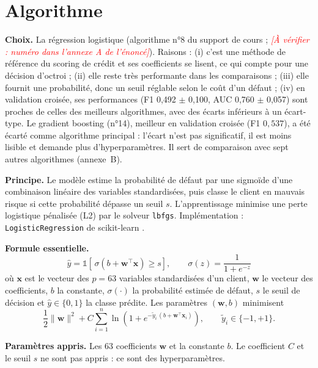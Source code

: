 \documentclass[12pt,a4paper]{article}
\newcommand{\verif}[1]{\textcolor{red}{\textit{[À vérifier : #1]}}}
\begin{document}
\section{Algorithme}\label{sec:algo}
\textbf{Choix.} La régression logistique (algorithme n°8 du support de cours \cite{cours} ; \verif{numéro dans l’annexe A de l’énoncé}). Raisons : (i) c’est une méthode de référence du scoring de crédit et ses coefficients se lisent, ce qui compte pour une décision d’octroi \cite{hand} ; (ii) elle reste très performante dans les comparaisons \cite{baesens} ; (iii) elle fournit une probabilité, donc un seuil réglable selon le coût d’un défaut ; (iv) en validation croisée, ses performances (F1 0{,}492 $\pm$ 0{,}100, AUC 0{,}760 $\pm$ 0{,}057) sont proches de celles des meilleurs algorithmes, avec des écarts inférieurs à un écart-type. Le gradient boosting (n°14), meilleur en validation croisée (F1 $0{,}537$), a été écarté comme algorithme principal : l’écart n’est pas significatif, il est moins lisible et demande plus d’hyperparamètres. Il sert de comparaison avec sept autres algorithmes (annexe~B).

\textbf{Principe.} Le modèle estime la probabilité de défaut par une sigmoïde d’une combinaison linéaire des variables standardisées, puis classe le client en \og mauvais risque \fg{} si cette probabilité dépasse un seuil $s$. L’apprentissage minimise une perte logistique pénalisée (L2) par le solveur \texttt{lbfgs}. Implémentation : \texttt{LogisticRegression} de scikit-learn \cite{sklearn}.

\textbf{Formule essentielle.}
\begin{equation}
\hat y=\mathbb 1\!\left[\,\sigma\!\left(b+\mathbf w^{\top}\mathbf x\right)\ge s\right],\qquad \sigma(z)=\frac{1}{1+e^{-z}}
\end{equation}
où $\mathbf x$ est le vecteur des $p=63$ variables standardisées d’un client, $\mathbf w$ le vecteur des coefficients, $b$ la constante, $\sigma(\cdot)$ la probabilité estimée de défaut, $s$ le seuil de décision et $\hat y\in\{0,1\}$ la classe prédite. Les paramètres $(\mathbf w,b)$ minimisent
\begin{equation}
\frac12\lVert\mathbf w\rVert^{2}+C\sum_{i=1}^{n}\ln\!\left(1+e^{-\tilde y_i\,(b+\mathbf w^{\top}\mathbf x_i)}\right),\qquad \tilde y_i\in\{-1,+1\}.
\end{equation}

\textbf{Paramètres appris.} Les 63 coefficients $\mathbf w$ et la constante $b$. Le coefficient $C$ et le seuil $s$ ne sont pas appris : ce sont des hyperparamètres.
\end{document}
